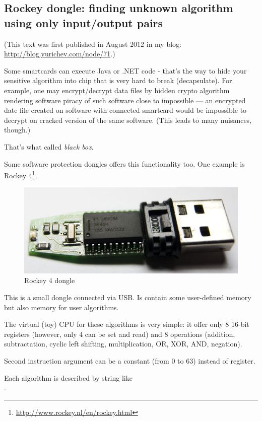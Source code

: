 ﻿\subsection{Rockey dongle: finding unknown algorithm using only input/output pairs}

(This text was first published in August 2012 in my blog: \url{http://blog.yurichev.com/node/71}.)

Some smartcards can execute Java or .NET code - that's the way to hide your sensitive algorithm
into chip that is very hard to break (decapsulate).
For example, one may encrypt/decrypt data files by hidden crypto algorithm rendering software
piracy of such software close to impossible --- an encrypted date file created on software with connected smartcard
would be impossible to decrypt on cracked version of the same software.
(This leads to many nuisances, though.)

That's what called \textit{black box}.

Some software protection dongles offers this functionality too.
One example is Rockey 4\footnote{\url{http://www.rockey.nl/en/rockey.html}}.

\begin{figure}[H]
\centering
\includegraphics[scale=2]{pgm_synth/rockey/rockey_4.jpg}
\caption{Rockey 4 dongle}
\end{figure}

This is a small dongle connected via USB. Is contain some user-defined memory but also memory for user algorithms.

The virtual (toy) CPU for these algorithms is very simple: it offer only 8 16-bit registers
(however, only 4 can be set and read) and 8 operations
(addition, subtractation, cyclic left shifting, multiplication, OR, XOR, AND, negation).

Second instruction argument can be a constant (from 0 to 63) instead of register.

Each algorithm is described by string like \\
.

